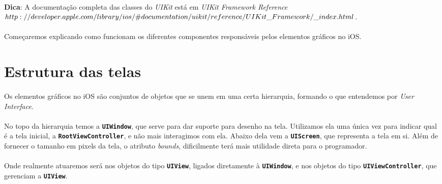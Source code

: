 \documentclass[a4paper,12pt,brazil,doubleside]{book}
\begin{document}
\begin{singlespace}
\begin{framed}
\paragraph{}\textbf{Dica}:  A documentação completa das classes do \textit{UIKit} está em 
\textit{ UIKit Framework Reference\\ \(http://developer.apple.com/library/ios/\#documentation/uikit/reference/\\UIKit\_Framework/\_index.html\)}.
\end{framed}

\paragraph{}Começaremos explicando como funcionam os diferentes componentes responsáveis pelos elementos gráficos no iOS.

\section{Estrutura das telas}

\paragraph{}Os elementos gráficos no iOS são conjuntos de objetos que se unem em uma certa hierarquia, formando o que entendemos por \emph{User Interface}.
\paragraph{}No topo da hierarquia temos a \texttt{\textbf{UIWindow}}, que serve para dar suporte para desenho na tela. Utilizamos ela uma única vez para indicar qual é a tela inicial, a \texttt{\textbf{RootViewController}}, e não mais interagimos com ela. Abaixo dela vem a \texttt{\textbf{UIScreen}}, que representa a tela em si. Além de fornecer o tamanho em pixels da tela, o atributo \emph{bounds}, dificilmente terá mais utilidade direta para o programador.
\paragraph{}Onde realmente atuaremos será nos objetos do tipo \texttt{\textbf{UIView}}, ligados diretamente à \texttt{\textbf{UIWindow}}, e nos objetos do tipo \texttt{\textbf{UIViewController}}, que gerenciam a \texttt{\textbf{UIView}}.

\bigskip
\bigskip


\end{singlespace}
\end{document}
